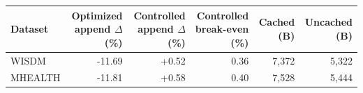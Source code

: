 \begin{tabular}{lrrrrr}
\toprule
Dataset & Optimized append $\Delta$ (\%) & Controlled append $\Delta$ (\%) & Controlled break-even (\%) & Cached (B) & Uncached (B) \\
\midrule
WISDM & -11.69 & +0.52 & 0.36 & 7,372 & 5,322 \\
MHEALTH & -11.81 & +0.58 & 0.40 & 7,528 & 5,444 \\
\bottomrule
\end{tabular}
